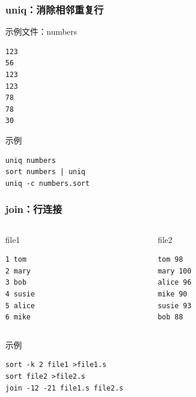 \documentclass[xcolor=svgnames,presentation]{beamer}
\begin{document}
\begin{frame}[fragile]
\frametitle{uniq：消除相邻重复行}
\label{sec-3-1-3}
\begin{exampleblock}{示例文件：numbers}
\label{sec-3-1-3-1}


\begin{verbatim}
123
56
123
123
78
78
30
\end{verbatim}
\end{exampleblock}
\begin{block}{示例}
\label{sec-3-1-3-2}


\begin{verbatim}
uniq numbers
sort numbers | uniq
uniq -c numbers.sort
\end{verbatim}
\end{block}
\end{frame}
\begin{frame}[fragile]
\frametitle{join：行连接}
\label{sec-3-1-4}
\label{sec-3-1-4-1}
\begin{columns}
\begin{column}{0.5\textwidth}
\begin{exampleblock}{file1}
\label{sec-3-1-4-1-1}


\begin{verbatim}
1 tom
2 mary
3 bob
4 susie
5 alice
6 mike
\end{verbatim}
\end{exampleblock}
\end{column}
\begin{column}{0.5\textwidth}
\begin{exampleblock}{file2}
\label{sec-3-1-4-1-2}


\begin{verbatim}
tom 98
mary 100
alice 96
mike 90
susie 93
bob 88
\end{verbatim}
\end{exampleblock}
\end{column}
\end{columns}
\begin{block}{示例}
\label{sec-3-1-4-2}


\begin{verbatim}
sort -k 2 file1 >file1.s
sort file2 >file2.s
join -12 -21 file1.s file2.s
\end{verbatim}
\end{block}
\end{frame}
\end{document}
